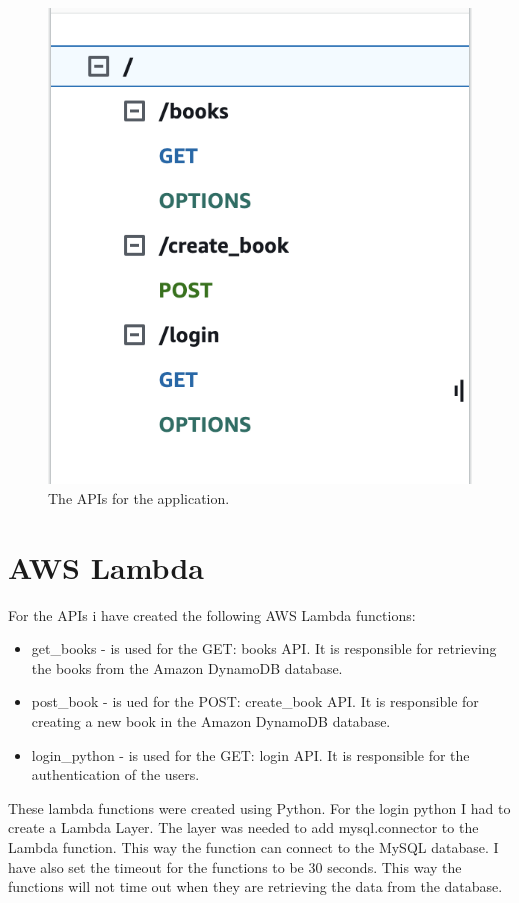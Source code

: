 \documentclass[11pt,a4paper,oneside]{report}
\begin{document}
\begin{figure}[!ht]
  \centering
  \includegraphics[scale=0.5]{api.png}
  \caption{The APIs for the application.}
  \label{fig:TexnicCenter}
\end{figure}

\section{AWS Lambda}

For the APIs i have created the following AWS Lambda functions:
\begin{itemize}
  \item get\_books - is used for the GET: books API. It is responsible for retrieving the books from the Amazon DynamoDB database.
  \item post\_book - is ued for the POST: create\_book API. It is responsible for creating a new book in the Amazon DynamoDB database.
  \item login\_python - is used for the GET: login API. It is responsible for the authentication of the users.
\end{itemize}

These lambda functions were created using Python. For the login python I had to create a Lambda Layer. The layer was needed to add mysql.connector to the Lambda function. This way the function can connect to the MySQL database. I have also set the timeout for the functions to be 30 seconds. This way the functions will not time out when they are retrieving the data from the database.
\end{document}

